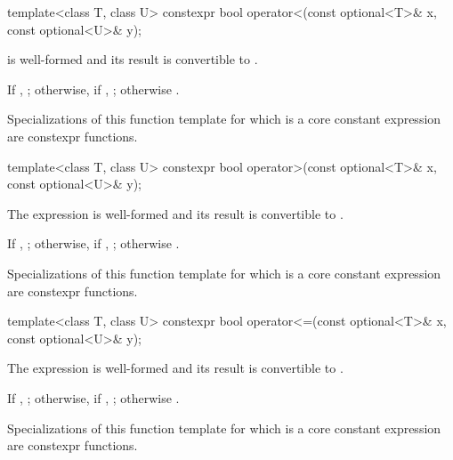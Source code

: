 %
\begin{itemdecl}
template<class T, class U>
  constexpr bool operator<(const optional<T>& x, const optional<U>& y);
\end{itemdecl}

\begin{itemdescr}
\pnum
\constraints
{} is well-formed and its result is convertible to .

\pnum
\returns
If , ; otherwise, if , ; otherwise .

\pnum
\remarks
Specializations of this function template for which  is a core constant expression are constexpr functions.
\end{itemdescr}

%
\begin{itemdecl}
template<class T, class U>
  constexpr bool operator>(const optional<T>& x, const optional<U>& y);
\end{itemdecl}

\begin{itemdescr}
\pnum
\constraints
The expression  is well-formed and its result is convertible to .

\pnum
\returns
If , ; otherwise, if , ; otherwise .

\pnum
\remarks
Specializations of this function template for which  is a core constant expression are constexpr functions.
\end{itemdescr}

%
\begin{itemdecl}
template<class T, class U>
  constexpr bool operator<=(const optional<T>& x, const optional<U>& y);
\end{itemdecl}

\begin{itemdescr}
\pnum
\constraints
The expression  is well-formed and its result is convertible to .

\pnum
\returns
If , ; otherwise, if , ; otherwise .

\pnum
\remarks
Specializations of this function template for which  is a core constant expression are constexpr functions.
\end{itemdescr}

